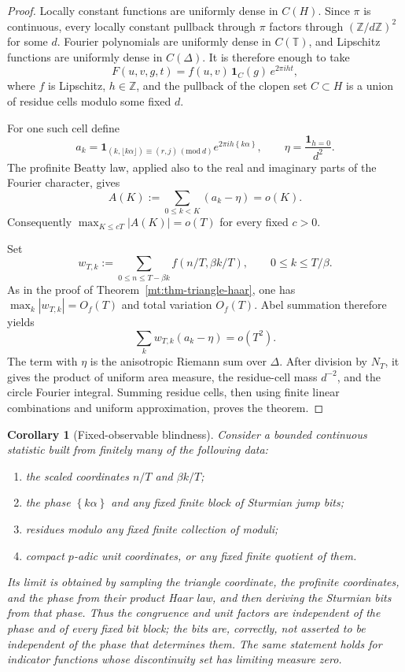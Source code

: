 \documentclass[11pt,oneside]{article}
\newtheorem{corollary}[theorem]{Corollary}
\theoremstyle{definition}
\theoremstyle{remark}
\newcommand{\Z}{\mathbb Z}
\newcommand{\Torus}{\mathbb T}
\newcommand{\fract}[1]{\left\{#1\right\}}
\begin{document}
\begin{proof}
Locally constant functions are uniformly dense in $C(H)$.  Since $\pi$ is continuous, every
locally constant pullback through $\pi$ factors through
$(\Z/d\Z)^2$ for some $d$.  Fourier polynomials are uniformly dense in $C(\Torus)$, and
Lipschitz functions are uniformly dense in $C(\Delta)$.  It is therefore enough to take
\[
 F(u,v,g,t)=f(u,v)\,\mathbf1_C(g)\,e^{2\pi iht},
\]
where $f$ is Lipschitz, $h\in\Z$, and the pullback of the clopen set $C\subset H$ is a union of
residue cells modulo some fixed $d$.

For one such cell define
\[
 a_k=
 \mathbf1_{(k,\lfloor k\alpha\rfloor)\equiv(r,j)\, (\mathrm{mod}\ d)}
 e^{2\pi ih\fract{k\alpha}},
 \qquad
 \eta=\frac{\mathbf1_{h=0}}{d^2}.
\]
The profinite Beatty law, applied also to the real and imaginary parts of the Fourier
character, gives
\[
 A(K):=\sum_{0\le k<K}(a_k-\eta)=o(K).
\]
Consequently
$\max_{K\le cT}|A(K)|=o(T)$ for every fixed $c>0$.

Set
\[
 w_{T,k}:=\sum_{0\le n\le T-\beta k}
 f\!\left(n/T,\beta k/T\right),
 \qquad 0\le k\le T/\beta.
\]
As in the proof of Theorem~\ref{mt:thm-triangle-haar}, one has
$\max_k|w_{T,k}|=O_f(T)$ and total variation $O_f(T)$.  Abel summation therefore yields
\[
 \sum_k w_{T,k}(a_k-\eta)=o(T^2).
\]
The term with $\eta$ is the anisotropic Riemann sum over $\Delta$.  After division by
$N_T$, it gives the product of uniform area measure, the residue-cell mass $d^{-2}$, and the
circle Fourier integral.  Summing residue cells, then using finite linear combinations and
uniform approximation, proves the theorem.
\end{proof}

\begin{corollary}[Fixed-observable blindness]
\label{mt:cor-fixed-observable-blindness}
Consider a bounded continuous statistic built from finitely many of the following data:
\begin{enumerate}[label=\textup{(\alph*)}]
\item the scaled coordinates $n/T$ and $\beta k/T$;
\item the phase $\fract{k\alpha}$ and any fixed finite block of Sturmian jump bits;
\item residues modulo any fixed finite collection of moduli;
\item compact $p$-adic unit coordinates, or any fixed finite quotient of them.
\end{enumerate}
Its limit is obtained by sampling the triangle coordinate, the profinite coordinates, and the
phase from their product Haar law, and then deriving the Sturmian bits from that phase.  Thus
the congruence and unit factors are independent of the phase and of every fixed bit block; the
bits are, correctly, not asserted to be independent of the phase that determines them.  The
same statement holds for indicator functions whose discontinuity set has limiting measure
zero.
\end{corollary}
\end{document}
